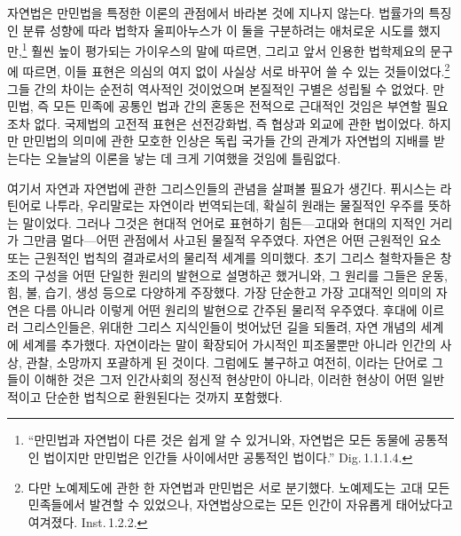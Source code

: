자연법은 만민법을 특정한 이론의 관점에서 바라본 것에
지나지 않는다.
법률가의 특징인 분류 성향에 따라
법학자 울피아누스가
이 둘을 구분하려는 애처로운 시도를 했지만,\footnote{%
  ``만민법과 자연법이 다른 것은 쉽게 알 수 있거니와,
  자연법은 모든 동물에 공통적인 법이지만 만민법은 인간들 사이에서만
  공통적인 법이다.'' Dig.\,1.1.1.4.}
훨씬 높이 평가되는 가이우스의 말에 따르면, 그리고
앞서 인용한 법학제요의 문구에 따르면,
이들 표현은 의심의 여지 없이 사실상 서로 바꾸어 쓸 수 있는
것들이었다.\footnote{다만 노예제도에 관한 한 자연법과 만민법은
서로 분기했다. 노예제도는 고대 모든 민족들에서 발견할 수 있었으나,
자연법상으로는 모든 인간이 자유롭게 태어났다고 여겨졌다. Inst.\,1.2.2.}
그들 간의 차이는 순전히 역사적인 것이었으며
본질적인 구별은 성립될 수 없었다.
만민법, 즉 모든 민족에 공통인 법과
 간의 혼동은 전적으로 근대적인 것임은
부연할 필요조차 없다.
국제법의 고전적 표현은
선전강화법,
즉 협상과 외교에 관한 법이었다.
하지만 만민법의 의미에 관한 모호한 인상은
독립 국가들 간의 관계가 자연법의 지배를 받는다는 오늘날의 이론을
낳는 데 크게 기여했을 것임에 틀림없다.

여기서
자연과 자연법에 관한 그리스인들의 관념을 살펴볼 필요가 생긴다.
퓌시스는 라틴어로 나투라, 우리말로는
자연이라 번역되는데,
확실히 원래는 물질적인 우주를 뜻하는 말이었다.
그러나 그것은 현대적 언어로 표현하기 힘든---고대와 현대의 지적인 거리가
그만큼 멀다---어떤 관점에서 사고된
물질적 우주였다.
자연은 어떤 근원적인 요소 또는 근원적인 법칙의 결과로서의
물리적 세계를 의미했다.
초기 그리스 철학자들은
창조의 구성을 어떤 단일한 원리의 발현으로 설명하곤 했거니와,
그 원리를 그들은 운동, 힘, 불, 습기, 생성 등으로 다양하게 주장했다.
가장 단순한고 가장 고대적인 의미의 자연은 다름 아니라
이렇게 어떤 원리의 발현으로
간주된 물리적 우주였다.
후대에 이르러 그리스인들은, 위대한 그리스 지식인들이 벗어났던 길을 되돌려,
자연 개념의  세계에  세계를 추가했다.
자연이라는 말이 확장되어 가시적인 피조물뿐만 아니라 인간의 사상, 관찰, 소망까지
포괄하게 된 것이다.
그럼에도 불구하고 여전히, 이라는 단어로 그들이 이해한 것은
그저 인간사회의 정신적 현상만이 아니라,
이러한 현상이 어떤 일반적이고 단순한 법칙으로 환원된다는 것까지 포함했다.

